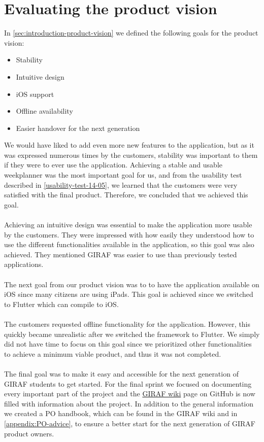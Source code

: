 \section{Evaluating the product vision}
In \autoref{sec:introduction-product-vision} we defined the following goals for the product vision:
\begin{itemize}
    \item Stability
    \item Intuitive design
    \item iOS support
    \item Offline availability
    \item Easier handover for the next generation
\end{itemize}
We would have liked to add even more new features to the application, but as it was expressed numerous times by the customers, stability was important to them if they were to ever use the application.
Achieving a stable and usable weekplanner was the most important goal for us, and from the usability test described in \autoref{usability-test-14-05}, we learned that the customers were very satisfied with the final product.
Therefore, we concluded that we achieved this goal. 
\\\\
Achieving an intuitive design was essential to make the application more usable by the customers.
They were impressed with how easily they understood how to use the different functionalities available in the application, so this goal was also achieved. They mentioned GIRAF was easier to use than previously tested applications.
\\\\
The next goal from our product vision was to to have the application available on iOS since many citizens are using iPads.
This goal is achieved since we switched to Flutter which can compile to iOS.
\\\\
The customers requested offline functionality for the application.
However, this quickly became unrealistic after we switched the framework to Flutter.
We simply did not have time to focus on this goal since we prioritized other functionalities to achieve a minimum viable product, and thus it was not completed.
\\\\
The final goal was to make it easy and accessible for the next generation of GIRAF students to get started.
For the final sprint we focused on documenting every important part of the project and the \href{https://github.com/aau-giraf/wiki}{GIRAF wiki} page on GitHub is now filled with information about the project. In addition to the general information we created a PO handbook, which can be found in the GIRAF wiki and in \autoref{appendix:PO-advice}, to ensure a better start for the next generation of GIRAF product owners.
